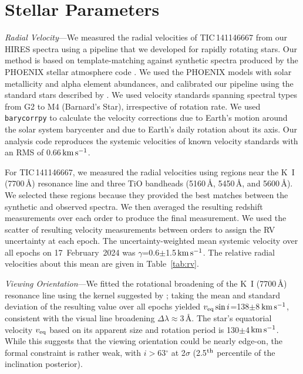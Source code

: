 \documentclass[11pt,twocolumn,tighten,linenumbers]{aastex7}
\newcommand{\kms}{\ensuremath{\rm km\,s^{-1}}}
\begin{document}

\appendix

\section{Stellar Parameters}
\label{sec:stparams}

{\it Radial Velocity}---We measured the radial velocities of
TIC\,141146667 from our HIRES spectra using a pipeline that we
developed for rapidly rotating stars.  Our method is based on
template-matching against synthetic spectra produced by the PHOENIX
stellar atmosphere code \citep{Husser2013}.  We used the PHOENIX models
with solar metallicity and alpha element abundances, and calibrated
our pipeline using the standard stars described by \citet{Chubak2012}.
We used velocity standards spanning spectral types from G2 to M4
(Barnard's Star), irrespective of rotation rate.  We used
\texttt{barycorrpy} \citep{Kanodia2018} to calculate the velocity
corrections due to Earth's motion around the solar system barycenter
and due to Earth's daily rotation about its axis.  Our analysis code
reproduces the systemic velocities of known velocity standards
\citep{Chubak2012} with an RMS of 0.66\,\kms.

For TIC\,141146667, we measured the radial velocities using regions
near the K~I (7700\,\AA) resonance line and three TiO bandheads
(5160\,\AA, 5450\,\AA, and 5600\,\AA).  We selected these regions
because they provided the best matches between the synthetic and
observed spectra.  We then averaged the resulting redshift
measurements over each order to produce the final measurement.  We
used the scatter of resulting velocity measurements between orders to
assign the RV uncertainty at each epoch.  The uncertainty-weighted
mean systemic velocity over all epochs on 17~February~2024 was
$\gamma$=0.6$\pm$1.5\,\kms.  The relative radial velocities about this
mean are given in Table~\ref{tab:rv}.

{\it Viewing Orientation}---We fitted the rotational broadening of the
K~I (7700\,\AA) resonance line using the kernel suggested by
\citet{Gray2008}; taking the mean and standard deviation of the
resulting value over all epochs yielded $v_{\rm eq} \sin
i$=138$\pm$8\,\kms, consistent with the visual line broadening $\Delta
\lambda$$\approx$3\,\AA.  The star's equatorial velocity $v_{\rm eq}$
based on its apparent size and rotation period is 130$\pm$4\,\kms.
While this suggests that the viewing orientation could be nearly
edge-on, the formal constraint is rather weak, with $i$$>$63$^\circ$
at 2$\sigma$ (2.5$^{\rm th}$ percentile of the inclination posterior).
\end{document}

